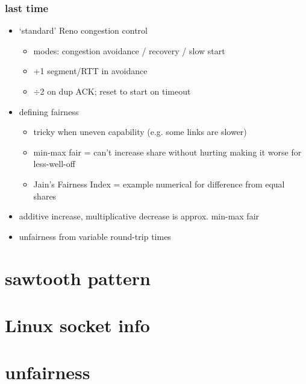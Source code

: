 \date{}
\title{}
\date{}
\usepackage{pgfplots}
\pgfplotsset{compat=1.16}

\begin{frame}
    \titlepage
\end{frame}



\begin{frame}
    \frametitle{last time}
    \begin{itemize}
        \item `standard' Reno congestion control
            \begin{itemize}
            \item modes: congestion avoidance / recovery / slow start
            \item +1 segment/RTT in avoidance
            \item $\div$2 on dup ACK; reset to start on timeout
            \end{itemize}
        \item defining fairness
            \begin{itemize}
            \item tricky when uneven capability (e.g. some links are slower)
            \item min-max fair = can't increase share without hurting making it worse for less-well-off
            \item Jain's Fairness Index = example numerical for difference from equal shares
            \end{itemize}
        \item additive increase, multiplicative decrease is approx. min-max fair
        \item unfairness from variable round-trip times
    \end{itemize}
\end{frame}

\section{sawtooth pattern}


\section{Linux socket info}



\section{unfairness}

